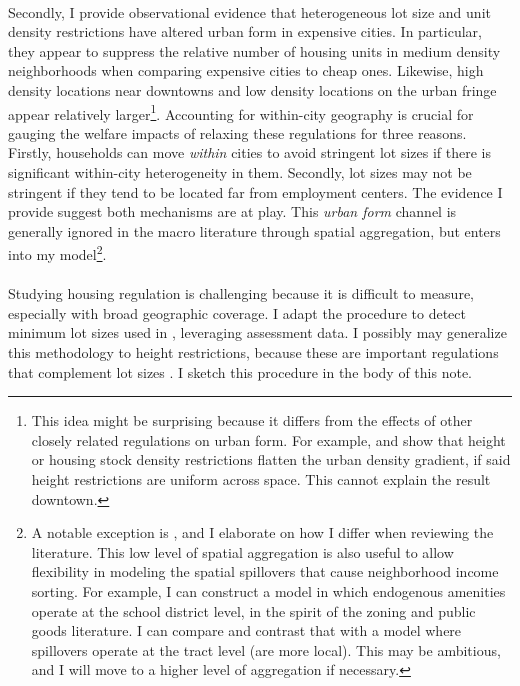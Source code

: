 \documentclass[]{article}
\begin{document}
\paragraph*{}
Secondly, I provide observational evidence that heterogeneous lot size and unit density restrictions have altered urban form in expensive cities. In particular, they appear to suppress the relative number of housing units in medium density neighborhoods when comparing expensive cities to cheap ones. Likewise, high density locations near downtowns and low density locations on the urban fringe appear relatively larger\footnote{This idea might be surprising because it differs from the effects of other closely related regulations on urban form. For example, \cite{bbheight} and \cite{mills2005} show that height or housing stock density restrictions flatten the urban density gradient, if said height restrictions are uniform across space. This cannot explain the result downtown.}. Accounting for within-city geography is crucial for gauging the welfare impacts of relaxing these regulations for three reasons. Firstly, households can move \textit{within} cities to avoid stringent lot sizes if there is significant within-city heterogeneity in them. Secondly, lot sizes may not be stringent if they tend to be located far from employment centers. The evidence I provide suggest both mechanisms are at play. This \textit{urban form} channel is generally ignored in the macro literature through spatial aggregation, but enters into my model\footnote{A notable exception is \cite{durantonpugaurbgrowth}, and I elaborate on how I differ when reviewing the literature. This low level of spatial aggregation is also useful to allow flexibility in modeling the spatial spillovers that cause neighborhood income sorting. For example, I can construct a model in which endogenous amenities operate at the school district level, in the spirit of the zoning and public goods literature. I can compare and contrast that with a model where spillovers operate at the tract level  (are more local).  This may be ambitious, and I will move to a higher level of aggregation if necessary.}.

\paragraph*{}
Studying housing regulation is challenging because it is difficult to measure, especially with broad geographic coverage. I adapt the procedure to detect minimum lot sizes used in \cite{Song}, leveraging assessment data. I possibly may generalize this methodology to height restrictions, because these are important regulations that complement lot sizes \citep{KSC}. I sketch this procedure in the body of this note.
\end{document}
